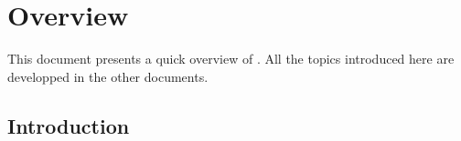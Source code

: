

\newcommand{\mantitle}{\textsc{Overview} }


\tableofcontents

\newcommand{\bigcaps}[1]{\uppercase{#1}}


\newcommand{\bii}{\\}
\newcommand{\eii}{\\\\}
\newcommand{\oidx}{\emph{oid}}
\newcommand{\oid}{{\oidx} }
\newcommand{\class}[1]{class \texttt{#1}}
\newcommand{\instance}[1]{instance of the \class{#1}}
\newcommand{\instances}[1]{instances of the \class{#1}}

\chapter*{Overview}

This document presents a quick overview of \eyedbX. All the topics introduced
here are developped in the other documents.

\section{Introduction}

